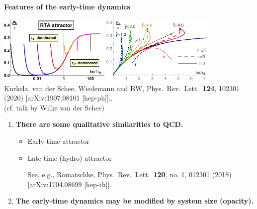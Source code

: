 \documentclass[9pt,a4paper,unknownkeysallowed,xcolor=dvipsnames,aspectratio=43]{beamer}
\begin{document}
\begin{frame}{\bf\huge Features of the early-time dynamics}
\vspace{2mm}
\begin{center}
\includegraphics[width=0.4\textwidth]{fig/RTAattract}
\includegraphics[width=0.4\textwidth]{fig/rcurve}\\
\vspace{2mm}
{\tiny  {\color{teablue}   Kurkela, van der Schee, Wiedemann and BW,
  Phys.\ Rev.\ Lett.\  {\bf 124}, 102301 (2020)
  [arXiv:1907.08101 [hep-ph]]..
  }}\\
  \vspace{2mm}
  {\color{teablue} (cf. talk by Wilke van der Schee)}
\end{center}
\begin{enumerate}
\item{\large\bf There are some qualitative similarities to QCD.}\\
\vspace{2mm}
\begin{itemize}
\item{\large Early-time attractor}\vspace{1mm}
\item{\large Late-time (hydro) attractor}
\begin{center}
{\tiny  See, e.g., {\color{teablue}  
    Romatschke,
  Phys.\ Rev.\ Lett.\  {\bf 120}, no. 1, 012301 (2018)
  [arXiv:1704.08699 [hep-th]].
  }}
\end{center}
\end{itemize}
\vspace{1mm}
\item{\bf The early-time dynamics may be modified by system size (opacity).}
\end{enumerate}
\end{frame}
\end{document}

